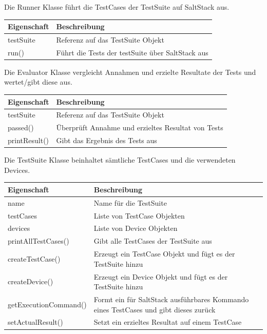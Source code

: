 \documentclass[a4,12pt]{scrartcl}
\begin{document}
Die Runner Klasse führt die TestCases der TestSuite auf SaltStack aus.
\noindent \begin{table}[H]
\centering
    \begin{tabular}{@{}l p{12cm} @{}}\toprule    
    {Eigenschaft} & {Beschreibung}\\ \midrule      
    testSuite & Referenz auf das TestSuite Objekt \\
    run() & Führt die Tests der testSuite über SaltStack aus\\
    \bottomrule
    \end{tabular}
\end{table}
\newpage

Die Evaluator Klasse vergleicht Annahmen und erzielte Resultate der Tests und wertet/gibt diese aus.
\noindent \begin{table}[H]
\centering
    \begin{tabular}{@{}l p{12cm} @{}}\toprule    
    {Eigenschaft} & {Beschreibung}\\ \midrule      
    testSuite & Referenz auf das TestSuite Objekt \\
    passed() & Überprüft Annahme und erzieltes Resultat von Tests\\
    printResult() & Gibt das Ergebnis des Tests aus
    \bottomrule
    \end{tabular}
\end{table}

Die TestSuite Klasse beinhaltet sämtliche TestCases und die verwendeten Devices.
\noindent \begin{table}[H]
\centering
    \begin{tabular}{@{}l p{12cm} @{}}\toprule    
    {Eigenschaft} & {Beschreibung}\\ \midrule      
    name & Name für die TestSuite \\
    testCases & Liste von TestCase Objekten\\
    devices & Liste von Device Objekten\\
    printAllTestCases() & Gibt alle TestCases der TestSuite aus\\
    createTestCase() & Erzeugt ein TestCase Objekt und fügt es der TestSuite hinzu\\
    createDevice() & Erzeugt ein Device Objekt und fügt es der TestSuite hinzu\\
    getExecutionCommand() & Formt ein für SaltStack ausführbares Kommando eines TestCases und gibt dieses zurück\\
    setActualResult() & Setzt ein erzieltes Resultat auf einem TestCase\\
    \bottomrule
    \end{tabular}
\end{table}
\end{document}

